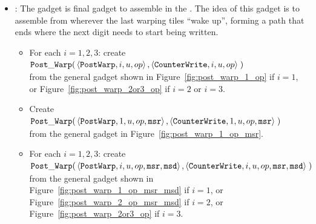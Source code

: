 \begin{itemize}
    \item {\postwarp}: The {\postwarp} gadget is final gadget to assemble in the {\warpunit}. The idea of this
    gadget is to assemble from wherever the last warping tiles ``wake up'', forming a path that ends where the
    next digit needs to start being written.

    \begin{itemize}
       \item For each $i = 1,2,3$: create\\
        $\begin{aligned}[t]
            \postwarp(& \left \langle {\tt PostWarp},     i, u, \inc \right\rangle,    %
                        \left \langle {\tt CounterWrite}, i, u, \inc \right\rangle \;) %
        \end{aligned}$ \\
        from the general gadget shown in Figure~\ref{fig:post_warp_1_op} if $i = 1$,
        or Figure~\ref{fig:post_warp_2or3_op} if $ i = 2$ or $i = 3$.
        \vspace{.5cm}


        \item Create
        $\begin{aligned}[t]
            \postwarp(& \left \langle {\tt PostWarp},     1, u, \inc, {\tt msr} \right\rangle,    %
                        \left \langle {\tt CounterWrite}, 1, u, \inc, {\tt msr} \right\rangle \;) %
        \end{aligned}$ \\
        from the general gadget in Figure~\ref{fig:post_warp_1_op_msr}.
        \vspace{.5cm}

        \item For each $i=1,2,3$: create\\
        $\begin{aligned}[t]
            \postwarp(& \left \langle {\tt PostWarp},     i, u, \inc, {\tt msr}, {\tt msd} \right\rangle,    %
                        \left \langle {\tt CounterWrite}, i, u, \inc, {\tt msr}, {\tt msd} \right\rangle \;) %
        \end{aligned}$ \\
        from the general gadget shown in Figure~\ref{fig:post_warp_1_op_msr_msd} if $i = 1$, or
        Figure~\ref{fig:post_warp_2_op_msr_msd} if $i = 2$, or Figure~\ref{fig:post_warp_2or3_op} if $i = 3$.
        \vspace{.5cm}


\end{itemize}
\end{itemize}
